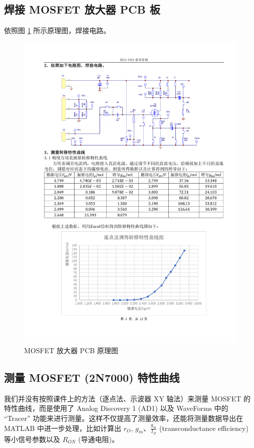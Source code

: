 \documentclass[UTF8]{article}
\begin{document}
\subsection{焊接 MOSFET 放大器 PCB 板}
依照图 \ref{fig: MOSFET 放大器 PCB 原理图} 所示原理图，焊接电路。
\begin{figure}[H]\centering
    \includegraphics[width=0.9\columnwidth]{LCE-04-场效应管/assets/MOSFET 放大器 PCB 原理图.pdf}
    \caption{MOSFET 放大器 PCB 原理图}
    \label{fig: MOSFET 放大器 PCB 原理图}
\end{figure}

\subsection{测量 MOSFET (2N7000) 特性曲线}

我们并没有按照课件上的方法（逐点法、示波器 XY 轴法）来测量 MOSFET 的特性曲线，而是使用了 Analog Discovery 1 (AD1) 以及 WaveForms 中的 ``Tracer'' 功能来进行测量。这样不仅提高了测量效率，还能将测量数据导出在 MATLAB 中进一步处理，比如计算出 $r_O$, $g_m$、$\frac{g_m}{I_D}$ (transconductance efficiency) 等小信号参数以及 $R_{ON}$ (导通电阻)。
\end{document}
